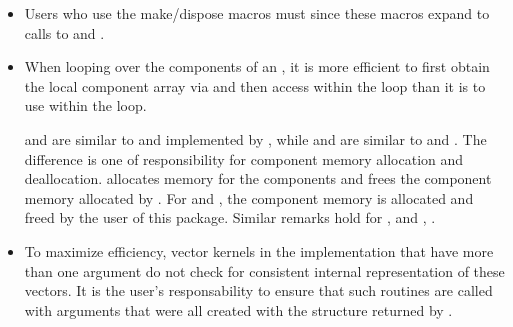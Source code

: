            
\begin{itemize}
                                        
\item
  Users who use the make/dispose macros must                 
   since these macros expand to calls to     
   and .                                             
       
\item
  When looping over the components of an  , it is     
  more efficient to first obtain the local component array via       
   and then access  within the     
  loop than it is to use  within the loop.        
                                                               
   and  are similar to  and  
   implemented by {\nvecp}, while  and 
    are      
  similar to   and . The        
  difference is one of responsibility for component memory     
  allocation and deallocation.  allocates memory  
  for the  components and  frees the     
  component memory allocated by . For    
  and , the component memory is allocated and      
  freed by the user of this package. Similar remarks hold for  
  ,   and ,              
  .                                            

\item
  To maximize efficiency, vector kernels in the {\nvecp} implementation
  that have more than one  argument do not check for
  consistent internal representation of these vectors. It is the user's 
  responsability to ensure that such routines are called with 
  arguments that were all created with the  structure returned
  by .

\end{itemize}

